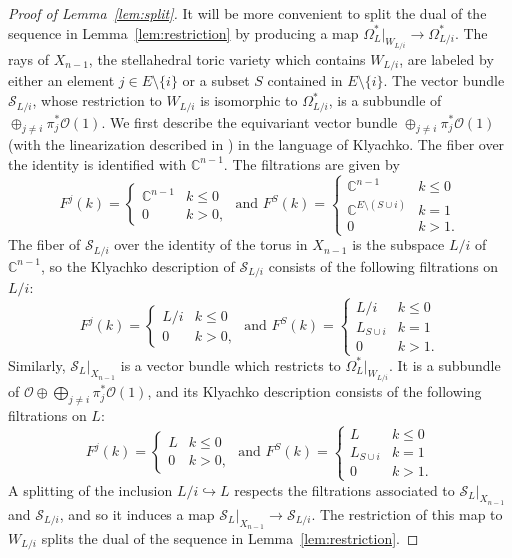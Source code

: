 \documentclass{amsart}
\theoremstyle{definition}
\begin{document}
\begin{proof}[Proof of Lemma~\ref{lem:split}]
It will be more convenient to split the dual of the sequence in Lemma~\ref{lem:restriction} by producing a map $\Omega_{L}^*|_{W_{L/i}} \to \Omega_{L/i}^*$. 
The rays of $X_{n-1}$, the stellahedral toric variety which contains $W_{L/i}$, are labeled by either an element $j \in E \setminus \{i\}$ or a subset $S$ contained in $E \setminus \{i\}$. The vector bundle $\mathcal{S}_{L/i}$, whose restriction to $W_{L/i}$ is isomorphic to $\Omega_{L/i}^*$, is a subbundle of $\oplus_{j \not= i} \pi_j^* \mathcal{O}(1)$. We first describe the equivariant vector bundle $\oplus_{j \not= i} \pi_j^* \mathcal{O}(1)$ (with the linearization described in \cite[Section 3.4]{EHL}) in the language of Klyachko. The fiber over the identity is identified with $\mathbb{C}^{n-1}$. The filtrations are given by
$$F^j(k) = \begin{cases} \mathbb{C}^{n-1} & k \le 0 \\ 0 & k > 0, \end{cases} \text{ and } F^S(k) = \begin{cases} \mathbb{C}^{n-1} & k \le 0 \\ \mathbb{C}^{E \setminus (S \cup i)} & k = 1 \\ 0 & k > 1. \end{cases}$$
The fiber of $\mathcal{S}_{L/i}$ over the identity of the torus in $X_{n-1}$ is the subspace $L/i$ of $\mathbb{C}^{n-1}$, so the Klyachko description of $\mathcal{S}_{L/i}$ consists of the following filtrations on $L/i$:
$$F^j(k) = \begin{cases} L/i & k \le 0 \\ 0 & k > 0, \end{cases} \text{ and } F^S(k) = \begin{cases} L/i & k \le 0 \\ L_{S \cup i} & k = 1 \\ 0 & k > 1. \end{cases}$$
Similarly, $\mathcal{S}_{L}|_{X_{n-1}}$ is a vector bundle which restricts to $\Omega_{L}^*|_{W_{L/i}}$. It is a subbundle of $\mathcal{O} \oplus \bigoplus_{j \not= i} \pi_j^* \mathcal{O}(1)$, and its Klyachko description consists of the following filtrations on $L$:
$$F^j(k) = \begin{cases} L & k \le 0 \\ 0 & k > 0, \end{cases} \text{ and } F^S(k) = \begin{cases} L & k \le 0 \\ L_{S \cup i} & k = 1 \\ 0 & k > 1. \end{cases}$$
A splitting of the inclusion $L/i \hookrightarrow L$ respects the filtrations associated to $\mathcal{S}_L|_{X_{n-1}}$ and $\mathcal{S}_{L/i}$, and so it induces a map $\mathcal{S}_{L}|_{X_{n-1}} \to \mathcal{S}_{L/i}$. The restriction of this map to $W_{L/i}$ splits the dual of the sequence in Lemma~\ref{lem:restriction}. 
\end{proof}
\end{document}
